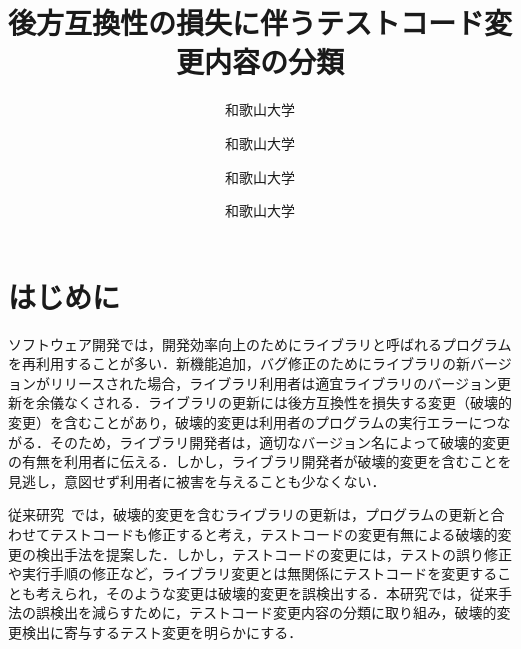 \documentclass[uplatex,dvipdfmx,a4paper,twocolumn,base=11pt,jbase=11pt,ja=standard]{bxjsarticle}  %
\title{後方互換性の損失に伴うテストコード変更内容の分類}{A classification of test code changes accompanied by a lack of backward compatibility}
\author{和歌山大学}{前川　大樹}{Daiki Maekawa, Wakayama University}
\author{和歌山大学}{伊原　彰紀}{Akinori Ihara, Wakayama University}
\author{和歌山大学}{大森　楓己}{Fuki Omori, Wakayama University}
\author{和歌山大学}{才木　一也}{Kazuya Saiki, Wakayama University}
\begin{document}
\maketitle

\section{はじめに}

ソフトウェア開発では，開発効率向上のためにライブラリと呼ばれるプログラムを再利用することが多い．新機能追加，バグ修正のためにライブラリの新バージョンがリリースされた場合，ライブラリ利用者は適宜ライブラリのバージョン更新を余儀なくされる．ライブラリの更新には後方互換性を損失する変更（破壊的変更）を含むことがあり，破壊的変更は利用者のプログラムの実行エラーにつながる．そのため，ライブラリ開発者は，適切なバージョン名によって破壊的変更の有無を利用者に伝える．しかし，ライブラリ開発者が破壊的変更を含むことを見逃し，意図せず利用者に被害を与えることも少なくない．


従来研究~\cite{FOSE2021_Matsuda}では，破壊的変更を含むライブラリの更新は，プログラムの更新と合わせてテストコードも修正すると考え，テストコードの変更有無による破壊的変更の検出手法を提案した．しかし，テストコードの変更には，テストの誤り修正や実行手順の修正など，ライブラリ変更とは無関係にテストコードを変更することも考えられ，そのような変更は破壊的変更を誤検出する．本研究では，従来手法の誤検出を減らすために，テストコード変更内容の分類に取り組み，破壊的変更検出に寄与するテスト変更を明らかにする．
\end{document}

